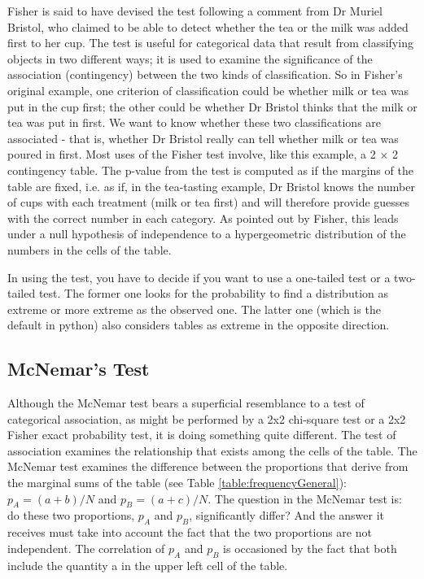 Fisher is said to have devised the test following a comment from Dr Muriel Bristol, who claimed to be able to detect whether the tea or the milk was added first to her cup. The test is useful for categorical data that result from classifying objects in two different ways; it is used to examine the significance of the association (contingency) between the two kinds of classification. So in Fisher's original example, one criterion of classification could be whether milk or tea was put in the cup first; the other could be whether Dr Bristol thinks that the milk or tea was put in first. We want to know whether these two classifications are associated - that is, whether Dr Bristol really can tell whether milk or tea was poured in first. Most uses of the Fisher test involve, like this example, a 2 × 2 contingency table. The p-value from the test is computed as if the margins of the table are fixed, i.e. as if, in the tea-tasting example, Dr Bristol knows the number of cups with each treatment (milk or tea first) and will therefore provide guesses with the correct number in each category. As pointed out by Fisher, this leads under a null hypothesis of independence to a hypergeometric distribution of the numbers in the cells of the table.

In using the test, you have to decide if you want to use a one-tailed test or a two-tailed test. The former one looks for the probability to find a distribution as extreme or more extreme as the observed one. The latter one (which is the default in python) also considers tables as extreme in the opposite direction.

\subsection{McNemar's Test}

Although the McNemar test bears a superficial resemblance to a test of categorical association, as might be performed by a 2x2 chi-square test or a 2x2 Fisher exact probability test, it is doing something quite different. The test of association examines the relationship that exists among the cells of the table. The McNemar test examines the difference between the proportions that derive from the marginal sums of the table (see Table \ref{table:frequencyGeneral}): $p_A=(a+b)/N$ and $p_B=(a+c)/N$. The question in the McNemar test is: do these two proportions, $p_A$ and $p_B$, significantly differ? And the answer it receives must take into account the fact that the two proportions are not independent. The correlation of $p_A$ and $p_B$ is occasioned by the fact that both include the quantity a in the upper left cell of the table.

